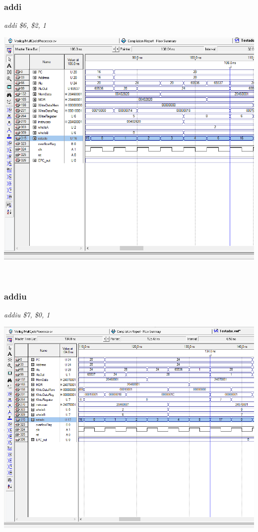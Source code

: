 \documentclass{article}
\begin{document}
    \subsubsection{addi}
    {\it addi \$6, \$2, 1}\\
    \begin{center}
        \includegraphics[scale=0.25]{addi.PNG}
    \end{center}
    
    \\
    \subsubsection{addiu}
    {\it addiu \$7, \$0, 1}\\
    \begin{center}
        \includegraphics[scale=0.25]{addiu.PNG}
    \end{center}
    
\end{document}
